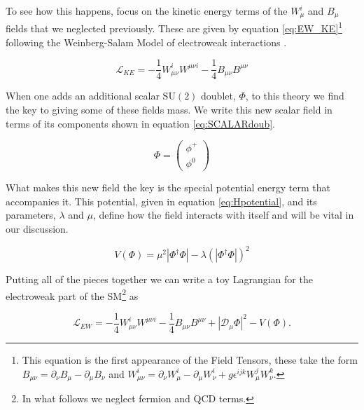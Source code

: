 To see how this happens, focus on the kinetic energy terms of the $W_{\mu}^{i}$ and $B_{\mu}$ fields that we neglected previously. These are given by equation \ref{eq:EW_KE}\footnote{This equation is the first appearance of the Field Tensors, these take the form $B_{\mu \nu} = \partial_{\nu}B_{\mu} - \partial_{\mu}B_{\nu}$ and $W_{\mu \nu}^{i} = \partial_{\nu}W_{\mu}^{i} - \partial_{\mu}W_{\nu}^{i} + g\epsilon^{ijk}W_{\mu}^{j}W_{\nu}^{k}$.} following the Weinberg-Salam Model of electroweak interactions \cite{StandardModel67_1,StandardModel67_2,StandardModel67_3,StandardModel67_4}.

\begin{equation}
\label{eq:EW_KE}
\mathcal{L}_{KE} = -\frac{1}{4}W_{\mu \nu}^{i}W^{\mu \nu i} - \frac{1}{4}B_{\mu \nu}B^{\mu \nu}
\end{equation}

When one adds an additional scalar $\mathrm{SU}(2)$ doublet, $\Phi$, to this theory we find the key to giving some of these fields mass. We write this new scalar field in terms of its components shown in equation \ref{eq:SCALARdoub}.

\begin{equation}
\label{eq:SCALARdoub}
\Phi = \begin{pmatrix} \phi^{+} \\ \phi^{0} \end{pmatrix}
\end{equation}

What makes this new field the key is the special potential energy term that accompanies it. This potential, given in equation \ref{eq:Hpotential}, and its parameters, $\lambda$ and $\mu$, define how the field interacts with itself and will be vital in our discussion.

\begin{equation}
\label{eq:Hpotential}
V\left(\Phi\right) = \mu^{2}\left|\Phi^{\dagger}\Phi\right| - \lambda\left(\left|\Phi^{\dagger}\Phi\right|\right)^{2}
\end{equation}

Putting all of the pieces together we can write a toy Lagrangian for the electroweak part of the SM\footnote{In what follows we neglect fermion and QCD terms.} as

\begin{equation}
\label{eq:EWsector}
\mathcal{L}_{EW} = -\frac{1}{4}W_{\mu \nu}^{i}W^{\mu \nu i} - \frac{1}{4}B_{\mu \nu}B^{\mu \nu} + \left|\mathcal{D}_{\mu}\Phi\right|^{2} - V\left(\Phi\right).
\end{equation}


